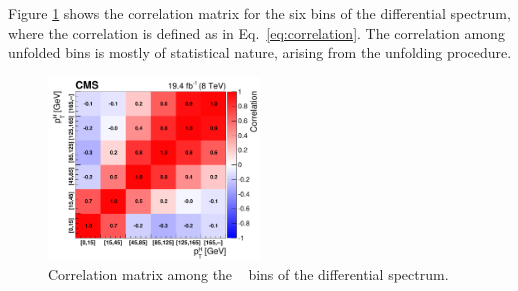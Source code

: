 Figure \ref{fig:cov_matrix} shows  the correlation matrix for the six bins of the differential spectrum, where the correlation is defined as in Eq.~\eqref{eq:correlation}. The correlation among unfolded bins is mostly of statistical nature, arising from the unfolding procedure.

\begin{figure}[htb]
\centering
\includegraphics[width=0.5\textwidth]{images/unblinding/covMatrix.pdf}
\caption{Correlation matrix among the \pth~ bins of the differential spectrum.}\label{fig:cov_matrix}
\end{figure}


